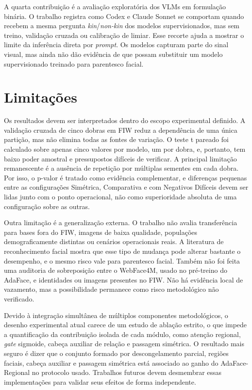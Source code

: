 A quarta contribuição é a avaliação exploratória dos VLMs em formulação binária. O trabalho registra como Codex e Claude Sonnet se comportam quando recebem a mesma pergunta \textit{kin}/\textit{non-kin} dos modelos supervisionados, mas sem treino, validação cruzada ou calibração de limiar. Esse recorte ajuda a mostrar o limite da inferência direta por \textit{prompt}. Os modelos capturam parte do sinal visual, mas ainda não dão evidência de que possam substituir um modelo supervisionado treinado para parentesco facial.

\section{Limitações}

Os resultados devem ser interpretados dentro do escopo experimental definido. A validação cruzada de cinco dobras em FIW reduz a dependência de uma única partição, mas não elimina todas as fontes de variação. O teste t pareado foi calculado sobre apenas cinco valores por modelo, um por dobra, e, portanto, tem baixo poder amostral e pressupostos difíceis de verificar. A principal limitação remanescente é a ausência de repetição por múltiplas sementes em cada dobra. Por isso, o p-valor é tratado como evidência complementar, e diferenças pequenas entre as configurações Simétrica, Comparativa e com Negativos Difíceis devem ser lidas junto com o ponto operacional, não como superioridade absoluta de uma configuração sobre as outras.

Outra limitação é a generalização externa. O trabalho não avalia transferência para bases fora do FIW, imagens de baixa qualidade, populações demograficamente distintas ou cenários operacionais reais. A literatura de reconhecimento facial mostra que esse tipo de mudança pode alterar bastante o desempenho, e o mesmo risco vale para parentesco facial. Também não foi feita uma auditoria de sobreposição entre o WebFace4M, usado no pré-treino do AdaFace, e identidades ou imagens presentes no FIW. Não há evidência local de vazamento, mas a possibilidade permanece como risco metodológico não verificado.

Devido à integração simultânea de múltiplos componentes metodológicos, o desenho experimental atual carece de um estudo de ablação estrito, o que impede a quantificação da contribuição isolada de cada módulo, como atenção regional, \textit{gate} sigmoide, cabeça auxiliar de relação e passagem simétrica. O resultado mais seguro é dizer que o conjunto formado por descongelamento parcial, regiões faciais, cabeça auxiliar e passagem simétrica está associado ao ganho do AdaFace-Regional no protocolo usado. Trabalhos futuros devem desmembrar essas implementações para validar seus efeitos de forma independente.

